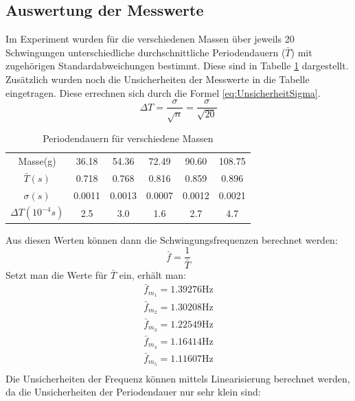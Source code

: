 \documentclass{report}
\begin{document}
\subsection{Auswertung der Messwerte}
Im Experiment wurden für die verschiedenen Massen über jeweils 20 Schwingungen unterschiedliche durchschnittliche Periodendauern ($\bar{T}$) mit zugehörigen Standardabweichungen bestimmt. Diese sind in 
Tabelle \ref{tab:T_m} dargestellt. Zusätzlich wurden noch die Unsicherheiten der Messwerte in die Tabelle eingetragen. Diese errechnen sich durch die Formel \ref{eq:UnsicherheitSigma}.
\begin{equation}
    \Delta T = \frac{\sigma}{\sqrt{n}} = \frac{\sigma}{\sqrt{20}}
    \label{eq:UnsicherheitSigma}
\end{equation}
\begin{table}[H]
    \centering
    \caption{Periodendauern für verschiedene Massen}
    \label{tab:T_m}
    \begin{tabular}{| c | c c c c c |}
        \hline
        Masse(g) & 36.18 & 54.36 & 72.49 & 90.60 & 108.75 \\
        $\bar{T}(s)$ & 0.718 & 0.768 & 0.816 & 0.859 & 0.896 \\
        $\sigma (s)$ & 0.0011 & 0.0013 & 0.0007 & 0.0012 & 0.0021 \\
        $\Delta T (10^{-4}s)$ & 2.5 & 3.0 & 1.6 & 2.7 & 4.7 \\
        \hline
    \end{tabular}
\end{table}
\noindent
Aus diesen Werten können dann die Schwingungsfrequenzen berechnet werden:
\begin{equation}
    \bar{f} = \frac{1}{\bar{T}}
\end{equation}
Setzt man die Werte für $\bar T$ ein, erhält man:
\begin{equation}
    \begin{split}
        \bar{f}_{m_1} = 1.39276 \si{\hertz} \\
        \bar{f}_{m_2} = 1.30208 \si{\hertz} \\
        \bar{f}_{m_3} = 1.22549 \si{\hertz} \\
        \bar{f}_{m_4} = 1.16414 \si{\hertz} \\
        \bar{f}_{m_5} = 1.11607 \si{\hertz} \\
    \end{split}
\end{equation}
Die Unsicherheiten der Frequenz können mittels Linearisierung berechnet werden, da die Unsicherheiten der Periodendauer nur sehr klein sind:
\end{document}
